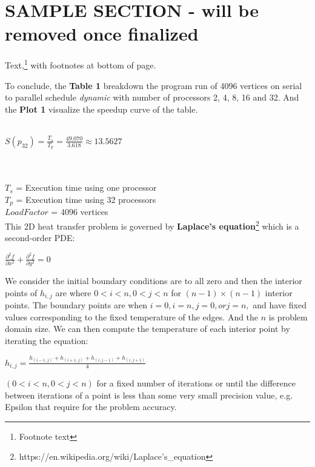 \documentclass[dareport.tex]{subfiles}
\begin{document}

\section{SAMPLE SECTION - will be removed once finalized}

Text,\footnote{Footnote text} with footnotes at bottom of page.

To conclude, the \textbf{Table 1} breakdown the program run of 4096 vertices on serial to parallel schedule \emph{dynamic} with number of processors 2, 4, 8, 16 and 32. And the \textbf{Plot 1} visualize the speedup curve of the table.
\\
\\

\begin{Large}
$S(p_{32}) =  \frac{T_{s}}{T_{p}} = \frac{49.070}{3.618} \approx 13.5627$
\end{Large}
\\
\\
$T_{s}$ = Execution time using one processor \\
$T_{p}$ = Execution time using 32 processors \\
$Load Factor$ = 4096 vertices
\\

This 2D heat transfer problem is governed by \textbf{Laplace's equation}\footnote{https://en.wikipedia.org/wiki/Laplace's\_equation} which is a second-order PDE:
\begin{center}
{\LARGE $\frac{\partial^{2}f}{\partial x^{2}} + \frac{\partial^2f}{\partial y^2} = 0$}
\end{center}


We consider the initial boundary conditions are to all zero and then the interior points of $h_{i,j}$ are where $0 < i < n, 0 < j < n$ for $(n - 1) \times (n - 1)$ interior points. The boundary points are when $i = 0, i = n, j = 0, or j = n,$ and have fixed values corresponding to the fixed temperature of the edges. And the $n$ is problem domain size. We can then compute the temperature of each interior point by iterating the equation:
\begin{center}
{\LARGE $h_{i,j} = \frac{h_{(i-1,j)} + h_{(i+1,j)} + h_{(i,j-1)} + h_{(i,j+1)}}{4}$ }
\end{center}
$(0<i<n, 0<j<n)$ for a fixed number of iterations or until the difference between iterations of a point is less than some very small precision value, e.g. Epsilon that require for the problem accuracy.
\\
\end{document}
